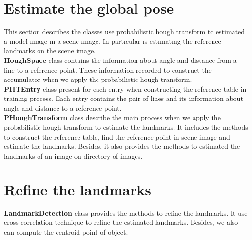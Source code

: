 \section{Estimate the global pose}
This section describes the classes use probabilistic hough transform to estimated a model image in a scene image. In particular is estimating the reference landmarks on the scene image.\\[0.2cm]
\textbf{HoughSpace} class contains the information about angle and distance from a line to a reference point. These information recorded to construct the accumulator when we apply the probabilistic hough transform.\\[0.2cm]
\textbf{PHTEntry} class present for each entry when constructing the reference table in training process. Each entry contains the pair of lines and its information about angle and distance to a reference point.\\[0.2cm]
\textbf{PHoughTransform} class describe the main process when we apply the probabilistic hough transform to estimate the landmarks. It includes the methods to construct the reference table, find the reference point in scene image and estimate the landmarks. Besides, it also provides the methods to estimated the landmarks of an image on directory of images.
\section{Refine the landmarks}
\textbf{LandmarkDetection} class provides the methods to refine the landmarks. It use cross-correlation technique to refine the estimated landmarks. Besides, we also can compute the centroid point of object.


